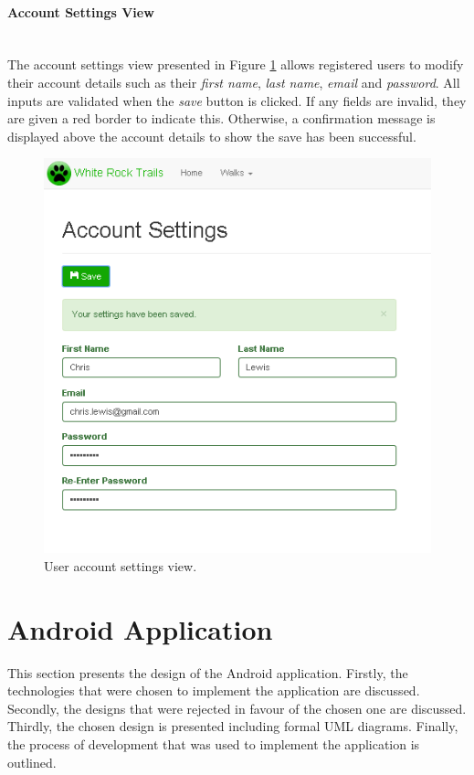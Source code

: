 \documentclass[11pt,a4paper]{report}
\begin{document}
\paragraph{Account Settings View}\mbox{}\\
The account settings view presented in Figure \ref{fig:user-account} allows registered users to modify their account details such as their \emph{first name}, \emph{last name}, \emph{email} and \emph{password}. All inputs are validated when the \emph{save} button is clicked. If any fields are invalid, they are given a red border to indicate this. Otherwise, a confirmation message is displayed above the account details to show the save has been successful.

\begin{figure}[H]
\centering
\includegraphics[width=0.7\linewidth]{./img/webportal/user-account}
\caption{User account settings view.}
\label{fig:user-account}
\end{figure}


\section{Android Application}
\label{sec:android-design}

This section presents the design of the Android application. Firstly, the technologies that were chosen to implement the application are discussed. Secondly, the designs that were rejected in favour of the chosen one are discussed. Thirdly, the chosen design is presented including formal UML diagrams. Finally, the process of development that was used to implement the application is outlined.
\end{document}
